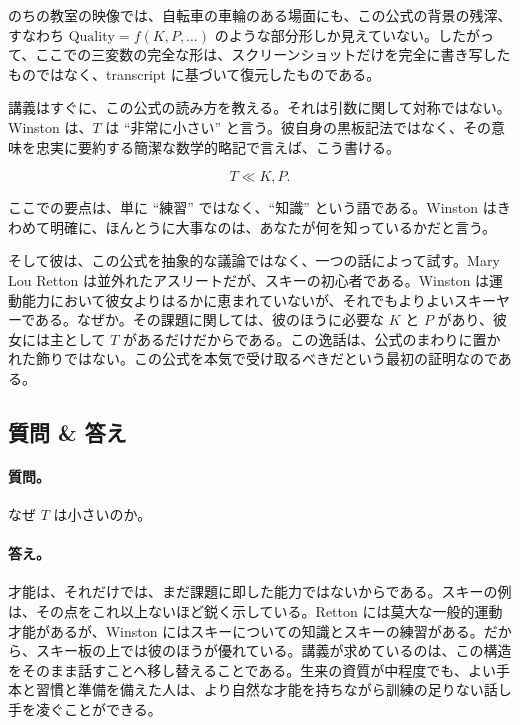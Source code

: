 \begin{remark}
のちの教室の映像では、自転車の車輪のある場面にも、この公式の背景の残滓、すなわち \(\text{Quality}=f(K,P,\ldots)\) のような部分形しか見えていない。したがって、ここでの三変数の完全な形は、スクリーンショットだけを完全に書き写したものではなく、transcript に基づいて復元したものである。
\end{remark}

講義はすぐに、この公式の読み方を教える。それは引数に関して対称ではない。Winston は、\(T\) は ``非常に小さい'' と言う。彼自身の黒板記法ではなく、その意味を忠実に要約する簡潔な数学的略記で言えば、こう書ける。

\begin{equation}
T \ll K,P.
\end{equation}

ここでの要点は、単に ``練習'' ではなく、``知識'' という語である。Winston はきわめて明確に、ほんとうに大事なのは、あなたが何を知っているかだと言う。

そして彼は、この公式を抽象的な議論ではなく、一つの話によって試す。Mary Lou Retton は並外れたアスリートだが、スキーの初心者である。Winston は運動能力において彼女よりはるかに恵まれていないが、それでもよりよいスキーヤーである。なぜか。その課題に関しては、彼のほうに必要な \(K\) と \(P\) があり、彼女には主として \(T\) があるだけだからである。この逸話は、公式のまわりに置かれた飾りではない。この公式を本気で受け取るべきだという最初の証明なのである。

\subsection{質問 \& 答え}

\paragraph{質問。} なぜ \(T\) は小さいのか。

\paragraph{答え。} 才能は、それだけでは、まだ課題に即した能力ではないからである。スキーの例は、その点をこれ以上ないほど鋭く示している。Retton には莫大な一般的運動才能があるが、Winston にはスキーについての知識とスキーの練習がある。だから、スキー板の上では彼のほうが優れている。講義が求めているのは、この構造をそのまま話すことへ移し替えることである。生来の資質が中程度でも、よい手本と習慣と準備を備えた人は、より自然な才能を持ちながら訓練の足りない話し手を凌ぐことができる。

